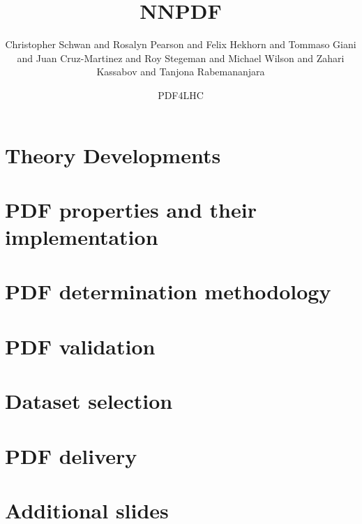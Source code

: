 \documentclass[xcolor={usenames,svgnames}]{beamer}
\author[NNPDF \& N3PDF]{
Christopher Schwan and
Rosalyn Pearson and
Felix Hekhorn and
Tommaso Giani and
Juan Cruz-Martinez and
Roy Stegeman and
Michael Wilson and
Zahari Kassabov and
Tanjona Rabemananjara
}
\title{NNPDF}
\date{PDF4LHC}
\author[\genericauthor]{} %
\institute{} %
\begin{document}
\section{Theory Developments}



\section{PDF properties and their implementation}



\section{PDF determination methodology}



\section{PDF validation}



\section{Dataset selection}


\section{PDF delivery}


\section{Additional slides}






\end{document}
